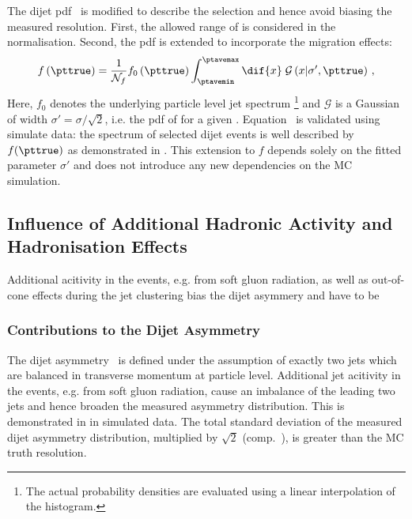 The dijet pdf~ is modified to describe the
\ptave selection and hence avoid biasing the measured resolution.
First, the allowed range of \ptave is considered in the normalisation. 
Second, the \pttrue pdf is extended to incorporate the migration effects:
\begin{equation}
  \label{eq:ResFit:Asym:ModifiedSpectrum}
  f\left(\pttrue\right) = \frac{1}{\mathcal{N}_{f}}
  f_{0}\left(\pttrue\right) \int^{\ptavemax}_{\ptavemin}\dif{x}\;\mathcal{G}\left(x|\sigma',\pttrue\right) \, ,
\end{equation}
Here, $f_{0}$ denotes the underlying particle level jet \pt spectrum \footnote{The actual probability densities are evaluated using a linear interpolation of the histogram.} and $\mathcal{G}$ is a Gaussian of width \mbox{$\sigma' = \sigma/\sqrt{2}$}, i.e. the pdf of \ptave for a given \pttrue.
Equation~ is validated using simulate data:
the \ptgen spectrum of selected dijet events is well described by $f(\pttrue)$ as demonstrated in .
This extension to $f$ depends solely on the fitted parameter $\sigma'$ and does not introduce any new dependencies on the MC simulation.





\subsection{Influence of Additional Hadronic Activity and Hadronisation Effects}\label{sec:ResFit:AddJets}

Additional acitivity in the events, e.g. from soft gluon radiation, as
well as out-of-cone effects during the jet clustering bias the dijet asymmery and have to be


\subsubsection{Contributions to the Dijet Asymmetry}\label{sec:ResFit:AddJets:Contributions}

The dijet asymmetry~ is defined under the assumption of exactly two jets which are balanced in transverse momentum at particle level.
Additional jet acitivity in the events, e.g. from soft gluon radiation, cause an imbalance of the leading two jets and hence broaden the measured asymmetry distribution.
This is demonstrated in  in simulated data.
The total standard deviation of the measured dijet asymmetry distribution, multiplied by $\sqrt{2}$ (comp.~), is greater than the MC truth resolution.


